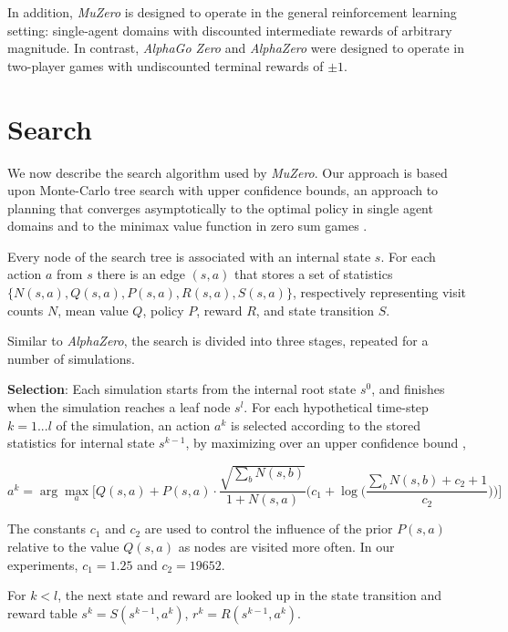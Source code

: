\documentclass{article}
\newcommand{\muzero}{\emph{MuZero}}
\newcommand{\alphazero}{\emph{AlphaZero}}
\newcommand{\alphagozero}{\emph{AlphaGo Zero}}
\begin{document}
\begin{appendices}
In addition, \muzero{} is designed to operate in the general reinforcement learning setting: single-agent domains with discounted intermediate rewards of arbitrary magnitude. In contrast, \alphagozero{} and \alphazero{} were designed to operate in two-player games with undiscounted terminal rewards of $\pm 1$.

\section{Search}

We now describe the search algorithm used by \muzero{}. Our approach is based upon Monte-Carlo tree search with upper confidence bounds, an approach to planning that converges asymptotically to the optimal policy in single agent domains and to the minimax value function in zero sum games \cite{kocsis-sepesvari}.

Every node of the search tree is associated with an internal state $s$.
For each action $a$ from $s$ there is an edge $(s,a)$ that stores a set of statistics
$\{N(s,a), Q(s,a), P(s,a), R(s,a), S(s,a) \}$, respectively representing visit counts $N$,
mean value $Q$, policy $P$, reward $R$, and state transition $S$.

Similar to \alphazero{}, the search is divided into three stages, repeated for a number of simulations.

{\bf Selection}: Each simulation starts from the internal root state $s^0$, and finishes when the simulation reaches a leaf node $s^l$.
For each hypothetical time-step $k = 1 ... l$ of the simulation, an action $a^k$ is selected according to the stored statistics for
internal state $s^{k-1}$, by maximizing over an upper confidence bound \cite{rosin:puct}\cite{Silver18AZ},

\begin{equation} \label{pUCT}
a^{k} = \arg\max_{a}\bigg[
Q(s, a) + P(s, a) \cdot \frac{\sqrt{\sum_b N(s, b)}}{1 + N(s, a)} \bigg(c_1 + \log\Big(\frac{\sum_b N(s, b) + c_2 + 1}{c_2}\Big)\bigg) \bigg]
\end{equation}

The constants $c_1$ and $c_2$ are used to control the influence of the prior $P(s, a)$ relative to the value $Q(s, a)$ as nodes are visited more often. In our experiments, $c_1 = 1.25$ and $c_2 = 19652$.

For $k<l$, the next state and reward are looked up in the state transition and reward table $s^{k} = S(s^{k-1}, a^{k})$, $r^{k} = R(s^{k-1}, a^{k})$.


\end{appendices}
\end{document}
